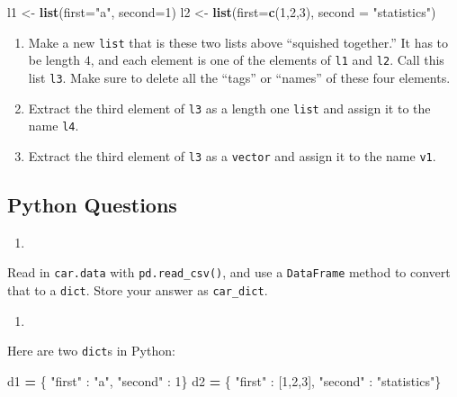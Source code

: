 \documentclass[12pt,krantz2]{krantz}
\makeatletter
\newenvironment{Shaded}{\begin{snugshade}}{\end{snugshade}}
\newcommand{\DataTypeTok}[1]{\textcolor[rgb]{0.27,0.27,0.27}{#1}}
\newcommand{\DecValTok}[1]{\textcolor[rgb]{0.06,0.06,0.06}{#1}}
\newcommand{\KeywordTok}[1]{\textcolor[rgb]{0.27,0.27,0.27}{\textbf{#1}}}
\newcommand{\NormalTok}[1]{#1}
\newcommand{\OperatorTok}[1]{\textcolor[rgb]{0.43,0.43,0.43}{\textbf{#1}}}
\newcommand{\StringTok}[1]{\textcolor[rgb]{0.5,0.5,0.5}{#1}}
\newenvironment{kframe}{%
\medskip{}
\setlength{\fboxsep}{.8em}
 \def\at@end@of@kframe{}%
 \ifinner\ifhmode%
  \def\at@end@of@kframe{\end{minipage}}%
  \begin{minipage}{\columnwidth}%
 \fi\fi%
 \def\FrameCommand##1{\hskip\@totalleftmargin \hskip-\fboxsep
 \colorbox{shadecolor}{##1}\hskip-\fboxsep
     \hskip-\linewidth \hskip-\@totalleftmargin \hskip\columnwidth}%
 \MakeFramed {\advance\hsize-\width
   \@totalleftmargin\z@ \linewidth\hsize
   \@setminipage}}%
 {\par\unskip\endMakeFramed%
 \at@end@of@kframe}
\renewenvironment{Shaded}{\begin{kframe}}{\end{kframe}}
\makeatother
\begin{document}
\begin{Shaded}
\begin{Highlighting}[]
\NormalTok{l1 <-}\StringTok{ }\KeywordTok{list}\NormalTok{(}\DataTypeTok{first=}\StringTok{"a"}\NormalTok{, }\DataTypeTok{second=}\DecValTok{1}\NormalTok{)}
\NormalTok{l2 <-}\StringTok{ }\KeywordTok{list}\NormalTok{(}\DataTypeTok{first=}\KeywordTok{c}\NormalTok{(}\DecValTok{1}\NormalTok{,}\DecValTok{2}\NormalTok{,}\DecValTok{3}\NormalTok{), }\DataTypeTok{second =} \StringTok{"statistics"}\NormalTok{)}
\end{Highlighting}
\end{Shaded}

\begin{enumerate}
\def\labelenumi{\alph{enumi})}
\item
  Make a new \texttt{list} that is these two lists above ``squished together.'' It has to be length \(4\), and each element is one of the elements of \texttt{l1} and \texttt{l2}. Call this list \texttt{l3}. Make sure to delete all the ``tags'' or ``names'' of these four elements.
\item
  Extract the third element of \texttt{l3} as a length one \texttt{list} and assign it to the name \texttt{l4}.
\item
  Extract the third element of \texttt{l3} as a \texttt{vector} and assign it to the name \texttt{v1}.
\end{enumerate}

\hypertarget{python-questions-3}{%
\subsection{Python Questions}\label{python-questions-3}}

\begin{enumerate}
\def\labelenumi{\arabic{enumi}.}
\item
\end{enumerate}

Read in \texttt{car.data} with \texttt{pd.read\_csv()}, and use a \texttt{DataFrame} method to convert that to a \texttt{dict}. Store your answer as \texttt{car\_dict}.

\begin{enumerate}
\def\labelenumi{\arabic{enumi}.}
\setcounter{enumi}{1}
\item
\end{enumerate}

Here are two \texttt{dict}s in Python:

\begin{Shaded}
\begin{Highlighting}[]
\NormalTok{d1 }\OperatorTok{=}\NormalTok{ \{ }\StringTok{"first"}\NormalTok{ : }\StringTok{"a"}\NormalTok{, }\StringTok{"second"}\NormalTok{ : }\DecValTok{1}\NormalTok{\}}
\NormalTok{d2 }\OperatorTok{=}\NormalTok{ \{ }\StringTok{"first"}\NormalTok{ : [}\DecValTok{1}\NormalTok{,}\DecValTok{2}\NormalTok{,}\DecValTok{3}\NormalTok{], }\StringTok{"second"}\NormalTok{ : }\StringTok{"statistics"}\NormalTok{\}}
\end{Highlighting}
\end{Shaded}
\end{document}
